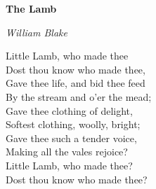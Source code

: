 \documentclass[imakeidx]{memoir}
\begin{document}
\textbf{The Lamb}

\emph{William Blake}

\begingroup
	\beginnumbering \autopar

Little Lamb, who made thee\\
Dost thou know who made thee,\\
Gave thee life, and bid thee feed\\
By the stream and o'er the mead;\\
Gave thee clothing of delight,\\
Softest clothing, woolly, bright;\\
Gave thee such a tender voice,\\
Making all the vales rejoice?\\
Little Lamb, who made thee?\\
Dost thou know who made thee?
	\endnumbering
\endgroup

\printindex
\end{document}
